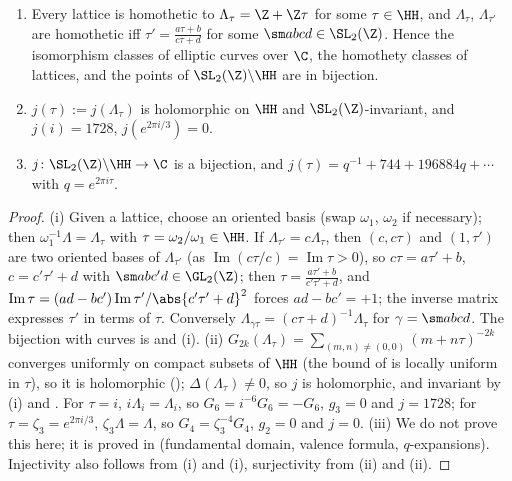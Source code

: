 \begin{theorem}\label{thm:ellcurves:moduli}
\leavevmode
\begin{enumerate}[label=(\roman*)]
\item Every lattice is homothetic to $\Lambda_\tau=\Z+\Z\tau$ for some $\tau\in\HH$, and $\Lambda_\tau$, $\Lambda_{\tau'}$ are homothetic iff $\tau'=\frac{a\tau+b}{c\tau+d}$ for some $\sm abcd\in\SL_2(\Z)$. Hence the
isomorphism classes of elliptic curves over $\C$, the homothety classes of lattices, and the points of $\SL_2(\Z)\backslash\HH$ are in bijection.
\item $j(\tau):=j(\Lambda_\tau)$ is holomorphic on $\HH$ and $\SL_2(\Z)$-invariant, and $j(i)=1728$, $j(e^{2\pi i/3})=0$.
\item $j\colon\SL_2(\Z)\backslash\HH\to\C$ is a bijection, and $j(\tau)=q^{-1}+744+196884q+\cdots$ with $q=e^{2\pi i\tau}$.
\end{enumerate}
\end{theorem}

\begin{proof}
(i) Given a lattice, choose an oriented basis (swap $\omega_1$, $\omega_2$ if necessary); then $\omega_1^{-1}\Lambda=\Lambda_\tau$ with $\tau=\omega_2/\omega_1\in\HH$. If $\Lambda_{\tau'}=c\Lambda_\tau$, then $(c,c\tau)$ and
$(1,\tau')$ are two oriented bases of $\Lambda_{\tau'}$ (as $\operatorname{Im}(c\tau/c)=\operatorname{Im}\tau>0$), so $c\tau=a\tau'+b$, $c=c'\tau'+d$ with $\sm ab{c'}d\in\GL_2(\Z)$; then
$\tau=\frac{a\tau'+b}{c'\tau'+d}$, and $\operatorname{Im}\tau=(ad-bc')\operatorname{Im}\tau'/\abs{c'\tau'+d}^2$ forces $ad-bc'=+1$; the inverse matrix expresses $\tau'$ in terms of $\tau$. Conversely $\Lambda_{\gamma\tau}=(c\tau+d)^{-1}\Lambda_\tau$ for $\gamma=\sm abcd$. The bijection with curves is
 and (i). (ii) $G_{2k}(\Lambda_\tau)=\sum_{(m,n)\ne(0,0)}(m+n\tau)^{-2k}$ converges uniformly on compact subsets of $\HH$ (the bound of
 is locally uniform in $\tau$), so it is holomorphic (); $\Delta(\Lambda_\tau)\ne0$, so $j$ is holomorphic, and invariant by (i) and
. For $\tau=i$, $i\Lambda_i=\Lambda_i$, so $G_6=i^{-6}G_6=-G_6$, $g_3=0$ and $j=1728$; for $\tau=\zeta_3=e^{2\pi i/3}$, $\zeta_3\Lambda=\Lambda$, so $G_4=\zeta_3^{-4}G_4$,
$g_2=0$ and $j=0$. (iii) We do not prove this here; it is proved in  (fundamental domain, valence formula, $q$-expansions). Injectivity also follows from (i) and
(i), surjectivity from (ii) and (ii).
\end{proof}

